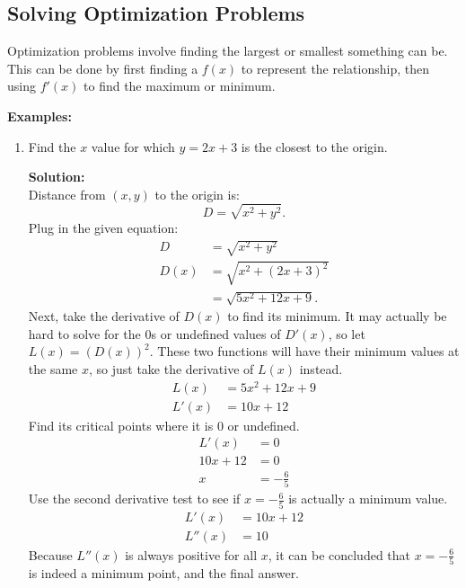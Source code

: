 \documentclass[12pt]{article}
\begin{document}
\subsection{Solving Optimization Problems}
Optimization problems involve finding the largest or smallest something can be. This can be done by first finding a $f(x)$ to represent the relationship, then using $f'(x)$ to find the maximum or minimum.

\noindent \textbf{Examples:}
\begin{enumerate}
    \item Find the $x$ value for which $y=2x+3$ is the closest to the origin.

          \noindent \textbf{Solution:}
          \\ Distance from $(x, y)$ to the origin is:
          \[ D = \sqrt{x^2 + y^2}. \]
          Plug in the given equation:
          \begin{align*}
              D    & = \sqrt{x^2 + y^2}       \\
              D(x) & = \sqrt{x^2 + (2x+3)^2}  \\
                   & = \sqrt{5x^2 + 12x + 9}.
          \end{align*}
          Next, take the derivative of $D(x)$ to find its minimum. It may actually be hard to solve for the $0$s or undefined values of $D'(x)$, so let $L(x) = \left( D(x) \right )^2$. These two functions will have their minimum values at the same $x$, so just take the derivative of $L(x)$ instead.
          \begin{align*}
              L(x)  & = 5x^2 + 12x + 9 \\
              L'(x) & = 10x + 12
          \end{align*}
          Find its critical points where it is $0$ or undefined.
          \begin{align*}
              L'(x)    & = 0            \\
              10x + 12 & = 0            \\
              x        & = -\frac{6}{5}
          \end{align*}
          Use the second derivative test to see if $x=-\frac{6}{5}$ is actually a minimum value.
          \begin{align*}
              L'(x)  & = 10x + 12 \\
              L''(x) & = 10
          \end{align*}
          Because $L''(x)$ is always positive for all $x$, it can be concluded that $x=-\frac{6}{5}$ is indeed a minimum point, and the final answer.


\end{enumerate}
\end{document}
